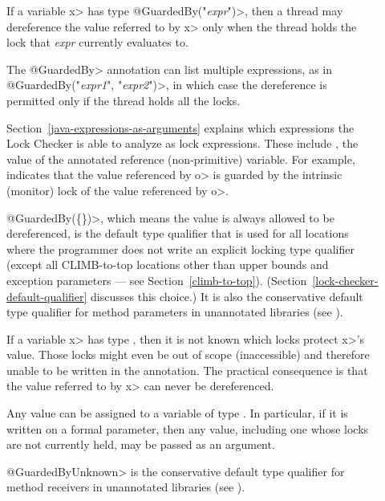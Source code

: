 \begin{description}

\item[]
  If a variable \<x> has type \<@GuardedBy("\emph{expr}")>, then a thread may
  dereference the value referred to by \<x> only when the thread holds the
  lock that \emph{expr} currently evaluates to.

  The \<@GuardedBy> annotation can list multiple expressions, as in
  \<@GuardedBy(\ttlcb"\emph{expr1}", "\emph{expr2}"\ttrcb)>, in which case
  the dereference is
  permitted only if the thread holds all the locks.

  Section~\ref{java-expressions-as-arguments} explains which
  expressions the Lock Checker is able to analyze as lock expressions.
  These include , the value of the annotated reference
  (non-primitive) variable.  For example, 
  indicates that the value referenced by \<o> is guarded by the intrinsic
  (monitor) lock of the value referenced by \<o>.

  \<@GuardedBy(\{\})>, which means the value is always allowed to be
  dereferenced, is the default type qualifier that is used for all locations
  where the programmer does not
  write an explicit locking type qualifier (except all CLIMB-to-top locations
  other than upper bounds and exception parameters --- see Section~\ref{climb-to-top}).
  (Section~\ref{lock-checker-default-qualifier} discusses this choice.)
  It is also the conservative
  default type qualifier for method parameters in unannotated libraries
  (see ).

\item[]
  If a variable \<x> has type , then
  it is not known which locks protect \<x>'s value.  Those locks might
  even be out of scope (inaccessible) and therefore unable to be written
  in the annotation.
  The practical consequence is that
  the value referred to by \<x> can never be dereferenced.

  Any value can be assigned to a variable of type
  .  In particular, if it is written on a
  formal parameter, then any value,
  including one whose locks are not currently held,
  may be passed as an argument.

  \<@GuardedByUnknown> is the conservative
  default type qualifier for method receivers in unannotated libraries
  (see ).


\end{description}
